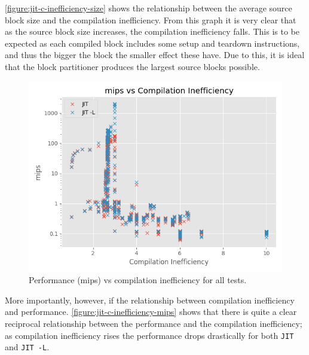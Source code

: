 \autoref{figure:jit-c-inefficiency-size} shows the relationship between the average source block size and the compilation inefficiency. From this graph it is very clear that as the source block size increases, the compilation inefficiency falls. This is to be expected as each compiled block includes some setup and teardown instructions, and thus the bigger the block the smaller effect these have. Due to this, it is ideal that the block partitioner produces the largest source blocks possible.

\begin{figure}[h]
    \centering
    \includegraphics[scale=0.75]{output/graphs/scatter/jit/c-efficiency-vs-mips.png}
    \caption{Performance (mips) vs compilation inefficiency for all tests.}
    \label{figure:jit-c-inefficiency-mips}
\end{figure}

More importantly, however, if the relationship between compilation inefficiency and performance. \autoref{figure:jit-c-inefficiency-mips} shows that there is quite a clear reciprocal relationship between the performance and the compilation inefficiency; as compilation inefficiency rises the performance drops drastically for both \texttt{JIT} and \texttt{JIT -L}.